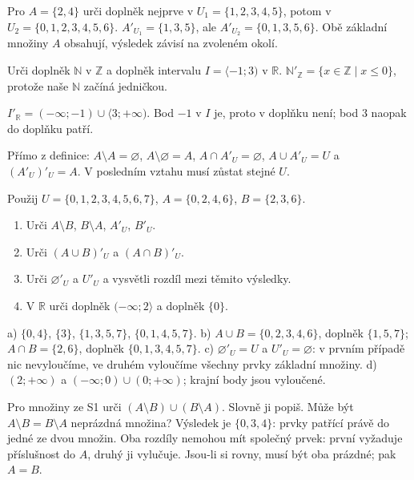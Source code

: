 \documentclass[11pt,a4paper]{article}
\begin{document}
\begin{prikladReseniBox}[title={P2: stejné $A$, jiné $U$},breakable=false]
Pro $A=\{2,4\}$ urči doplněk nejprve v $U_1=\{1,2,3,4,5\}$,
potom v $U_2=\{0,1,2,3,4,5,6\}$.
\tcblower
$A'_{U_1}=\{1,3,5\}$, ale $A'_{U_2}=\{0,1,3,5,6\}$.
Obě základní množiny $A$ obsahují, výsledek závisí na zvoleném okolí.
\end{prikladReseniBox}
\begin{prikladReseniBox}[title={P3: nekonečná základní množina},breakable=false]
Urči doplněk $\mathbb N$ v $\mathbb Z$ a doplněk intervalu
$I=\langle-1;3)$ v $\mathbb R$.
\tcblower
$\mathbb N'_{\mathbb Z}=\{x\in\mathbb Z\mid x\le0\}$, protože naše $\mathbb N$ začíná jedničkou.

$I'_{\mathbb R}=(-\infty;-1)\cup\langle3;+\infty)$.
Bod $-1$ v $I$ je, proto v doplňku není; bod $3$ naopak do doplňku patří.
\end{prikladReseniBox}
Přímo z definice: $A\setminus A=\varnothing$, $A\setminus\varnothing=A$,
$A\cap A'_U=\varnothing$, $A\cup A'_U=U$ a $(A'_U)'_U=A$.
V posledním vztahu musí zůstat stejné $U$.

\begin{zadaniReseniBox}[title={S1: rozdíl, doplněk a krajní body},breakable=false]
Použij $U=\{0,1,2,3,4,5,6,7\}$, $A=\{0,2,4,6\}$, $B=\{2,3,6\}$.
\begin{enumerate}[label=\alph*)]
\item Urči $A\setminus B$, $B\setminus A$, $A'_U$, $B'_U$.
\item Urči $(A\cup B)'_U$ a $(A\cap B)'_U$.
\item Urči $\varnothing'_U$ a $U'_U$ a vysvětli rozdíl mezi těmito výsledky.
\item V $\mathbb R$ urči doplněk $(-\infty;2\rangle$ a doplněk $\{0\}$.
\end{enumerate}
\tcblower
a) $\{0,4\}$, $\{3\}$, $\{1,3,5,7\}$, $\{0,1,4,5,7\}$.
b) $A\cup B=\{0,2,3,4,6\}$, doplněk $\{1,5,7\}$;
$A\cap B=\{2,6\}$, doplněk $\{0,1,3,4,5,7\}$.
c) $\varnothing'_U=U$ a $U'_U=\varnothing$: v prvním případě nic nevyloučíme,
ve druhém vyloučíme všechny prvky základní množiny.
d) $(2;+\infty)$ a $(-\infty;0)\cup(0;+\infty)$; krajní body jsou vyloučené.
\end{zadaniReseniBox}

\begin{zadaniReseniBox}[title={R1: právě jedna podmínka},breakable=false]
Pro množiny ze S1 urči $(A\setminus B)\cup(B\setminus A)$.
Slovně ji popiš. Může být $A\setminus B=B\setminus A$ neprázdná množina?
\tcblower
Výsledek je $\{0,3,4\}$: prvky patřící právě do jedné ze dvou množin.
Oba rozdíly nemohou mít společný prvek: první vyžaduje příslušnost do $A$,
druhý ji vylučuje. Jsou-li si rovny, musí být oba prázdné; pak $A=B$.
\end{zadaniReseniBox}
\end{document}
